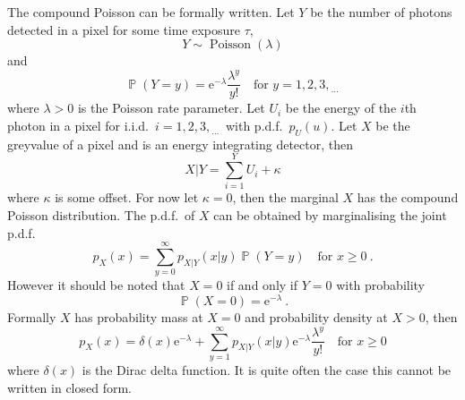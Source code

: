 \documentclass[12pt, a4paper]{memoir}
\DeclareMathOperator{\prob}{\mathbb{P}}
\DeclareMathOperator{\poisson}{Poisson}
\newcommand{\euler}{\mathrm{e}}
\newcommand{\dotdotdot}{_{\phantom{.}\cdots}}
\begin{document}
The compound Poisson can be formally written. Let $Y$ be the number of photons detected in a pixel for some time exposure $\tau$,
\begin{equation*}
Y\sim\poisson(\lambda)
\end{equation*}
and
\begin{equation*}
\prob(Y=y)=\euler^{-\lambda}\frac{\lambda^y}{y!} \quad \text{for }y=1,2,3,\dotdotdot
\end{equation*}
where $\lambda>0$ is the Poisson rate parameter. Let $U_i$ be the energy of the $i$th photon in a pixel for i.i.d.~$i=1,2,3,\dotdotdot$ with p.d.f.~$p_U(u)$. Let $X$ be the greyvalue of a pixel and is an energy integrating detector, then
\begin{equation}
X|Y = \sum_{i=1}^{Y}U_i+\kappa
\label{eq:compoundPoisson_X|Y}
\end{equation}
where $\kappa$ is some offset. For now let $\kappa=0$, then the marginal $X$ has the compound Poisson distribution. The p.d.f.~of $X$ can be obtained by marginalising the joint p.d.f.
\begin{equation*}
p_X(x)=\sum_{y=0}^\infty p_{X|Y}(x|y)\prob(Y=y) \quad\text{for }x\geqslant 0\ .
\end{equation*}
However it should be noted that $X=0$ if and only if $Y=0$ with probability
\begin{equation*}
\prob(X=0)=\euler^{-\lambda} \ .
\end{equation*}
Formally $X$ has probability mass at $X=0$ and probability density at $X>0$, then 
\begin{equation}
p_X(x) = \delta(x) \euler^{-\lambda} + \sum_{y=1}^\infty p_{X|Y}(x|y)\euler^{-\lambda}\frac{\lambda^y}{y!} \quad\text{for }x\geqslant 0
\end{equation}
where $\delta(x)$ is the Dirac delta function. It is quite often the case this cannot be written in closed form.
\end{document}
